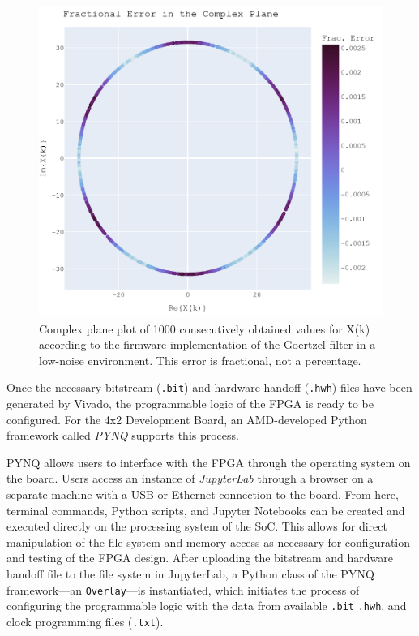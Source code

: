 \documentclass[reprint,amsmath,amssymb,aps,pra]{revtex4-2}
\begin{document}
\begin{figure}[t]
    \centering
    \includegraphics[width=\linewidth]{figs/error_complex.png}
    \caption{Complex plane plot of 1000 consecutively obtained values for X(k) according to the firmware implementation of the Goertzel filter in a low-noise environment. This error is fractional, not a percentage.}
    \label{fig:fracerror2}
\end{figure}

Once the necessary bitstream (\verb|.bit|) and hardware handoff (\verb|.hwh|) files have been generated by Vivado, the programmable logic of the FPGA is ready to be configured. For the 4x2 Development Board, an AMD-developed Python framework called \textit{PYNQ} supports this process.

PYNQ allows users to interface with the FPGA through the operating system on the board. Users access an instance of \textit{JupyterLab} through a browser on a separate machine with a USB or Ethernet connection to the board. From here, terminal commands, Python scripts, and Jupyter Notebooks can be created and executed directly on the processing system of the SoC. This allows for direct manipulation of the file system and memory access as necessary for configuration and testing of the FPGA design. After uploading the bitstream and hardware handoff file to the file system in JupyterLab, a Python class of the PYNQ framework---an \verb|Overlay|---is instantiated, which initiates the process of configuring the programmable logic with the data from available \verb|.bit| \verb|.hwh|, and clock programming files (\verb|.txt|).
\end{document}
